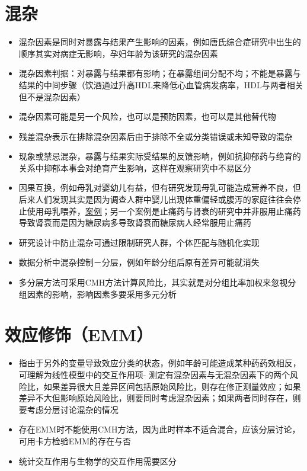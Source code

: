 \documentclass[]{book}
\providecommand{\tightlist}{%
  \setlength{\itemsep}{0pt}\setlength{\parskip}{0pt}}
\begin{document}
\section{混杂}

\begin{itemize}
\tightlist
\item
  混杂因素是同时对暴露与结果产生影响的因素，例如唐氏综合症研究中出生的顺序其实对病症无影响，孕妇年龄为该研究的混杂因素
\item
  混杂因素判据：对暴露与结果都有影响；在暴露组间分配不均；不能是暴露与结果的中间步骤（饮酒通过升高HDL来降低心血管病发病率，HDL与两者相关但不是混杂因素）
\item
  混杂因素可能是另一个风险，也可以是预防因素，也可以是其他替代物
\item
  残差混杂表示在排除混杂因素后由于排除不全或分类错误或未知导致的混杂
\item
  现象或禁忌混杂，暴露与结果实际受结果的反馈影响，例如抗抑郁药与绝育的关系中抑郁本事会对绝育产生影响，这样在观察研究中不易区分
\item
  因果互换，例如母乳对婴幼儿有益，但有研究发现母乳可能造成营养不良，但后来人们发现其实是因为调查人群中婴儿出现体重偏轻或腹泻的家庭往往会停止使用母乳喂养，\href{http://ije.oxfordjournals.org/content/26/2/349.full.pdf+html}{案例}；另一个案例是止痛药与肾衰的研究中并非服用止痛药导致肾衰而是因为糖尿病多导致肾衰而糖尿病人经常服用止痛药
\item
  研究设计中防止混杂可通过限制研究人群，个体匹配与随机化实现
\item
  数据分析中混杂控制－分层，例如年龄分组后原有差异可能就消失
\item
  多分层方法可采用CMH方法计算风险比，其实就是对分组比率加权来忽视分组因素的影响，影响因素多要采用多元分析
\end{itemize}

\hypertarget{emm}{%
\section{效应修饰（EMM）}\label{emm}}

\begin{itemize}
\tightlist
\item
  指由于另外的变量导致效应分类的状态，例如年龄可能造成某种药药效相反，可理解为线性模型中的交互作用项- 测定有混杂因素与无混杂因素下的两个风险比，如果差异很大且差异区间包括原始风险比，则存在修正测量效应；如果差异不大但影响原始风险比，则要同时考虑混杂因素；如果两者同时存在，则要考虑分层讨论混杂的情况
\item
  存在EMM时不能使用CMH方法，因为此时样本不适合混合，应该分层讨论，可用卡方检验EMM的存在与否
\item
  统计交互作用与生物学的交互作用需要区分
\end{itemize}
\end{document}
